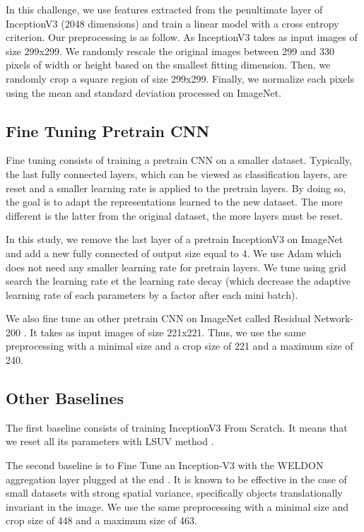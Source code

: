 \documentclass[10pt,twocolumn,letterpaper]{article}
\begin{document}
In this challenge, we use features extracted from the penultimate layer of InceptionV3 \cite{szegedy2015rethinking} (2048 dimensions) and train a linear model with a cross entropy criterion. Our preprocessing is as follow. As InceptionV3 takes as input images of size 299x299. We randomly rescale the original images between 299 and 330 pixels of width or height based on the smallest fitting dimension. Then, we randomly crop a square region of size 299x299. Finally, we normalize each pixels using the mean and standard deviation processed on ImageNet.


\subsection{Fine Tuning Pretrain CNN}

Fine tuning consists of training a pretrain CNN on a smaller dataset. Typically, the last fully connected layers, which can be viewed as classification layers, are reset and a smaller learning rate is applied to the pretrain layers. By doing so, the goal is to adapt the representations learned to the new dataset. The more different is the latter from the original dataset, the more layers must be reset.

In this study, we remove the last layer of a pretrain InceptionV3 on ImageNet and add a new fully connected of output size equal to 4. We use Adam \cite{Kingma14} which does not need any smaller learning rate for pretrain layers. We tune using grid search the learning rate et the learning rate decay (which decrease the adaptive learning rate of each parameters by a factor after each mini batch).

We also fine tune an other pretrain CNN on ImageNet called Residual Network-200 \cite{he2016deep}. It takes as input images of size 221x221. Thus, we use the same preprocessing with a minimal size and a crop size of 221 and a maximum size of 240.


\subsection{Other Baselines}

The first baseline consists of training InceptionV3 From Scratch. It means that we reset all its parameters with LSUV method \cite{LSUVInit2015}.

The second baseline is to Fine Tune an Inception-V3 with the WELDON aggregation layer plugged at the end \cite{durand2016weldon}.
It is known to be effective in the case of small datasets with strong spatial variance, specifically objects translationally invariant in the image.
We use the same preprocessing with a minimal size and crop size of 448 and a maximum size of 463.
\end{document}
